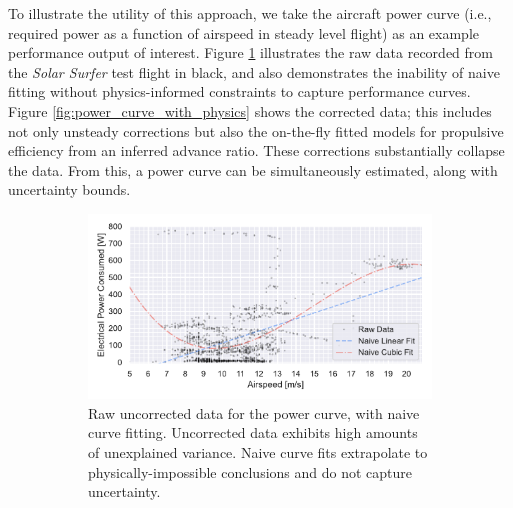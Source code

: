 \documentclass[12pt,vi,oneside,table]{report}
\begin{document}
    To illustrate the utility of this approach, we take the aircraft power curve (i.e., required power as a function of airspeed in steady level flight) as an example performance output of interest. Figure \ref{fig:power_curve_naive} illustrates the raw data recorded from the \textit{Solar Surfer} test flight in black, and also demonstrates the inability of naive fitting without physics-informed constraints to capture performance curves. Figure \ref{fig:power_curve_with_physics} shows the corrected data; this includes not only unsteady corrections but also the on-the-fly fitted models for propulsive efficiency from an inferred advance ratio. These corrections substantially collapse the data. From this, a power curve can be simultaneously estimated, along with uncertainty bounds.

    \begin{figure}[h]
        \centering
        \begin{subfigure}[b]{0.8\textwidth}
            \centering
            \includegraphics[width=\textwidth]{../figures/aircraft_polar_reconstruction/figures/power_polar_naive}
            \caption{Raw uncorrected data for the power curve, with naive curve fitting. Uncorrected data exhibits high amounts of unexplained variance. Naive curve fits extrapolate to physically-impossible conclusions and do not capture uncertainty.}
            \label{fig:power_curve_naive}
        \end{subfigure}
        \begin{subfigure}[b]{0.8\textwidth}
            \centering

\end{subfigure}
\end{figure}
\end{document}
